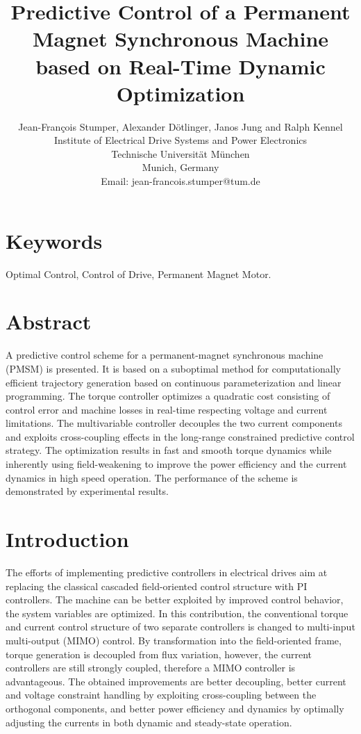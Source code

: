 \documentclass[a4paper,11pt,fleqn]{article}
\title{\LARGE \bf Predictive Control of a Permanent Magnet Synchronous Machine based on Real-Time Dynamic Optimization
}
\author{
Jean-Fran\c cois Stumper, Alexander D\"otlinger, Janos Jung and Ralph Kennel\\
Institute of Electrical Drive Systems and Power Electronics\\
Technische Universit\"at M\"unchen\\
Munich, Germany\\
Email: jean-francois.stumper@tum.de}
\date{}
\begin{document}
\setlength{\parindent}{0mm}
\baselineskip 10pt


\maketitle




\section*{Keywords}
\flqq Optimal Control\frqq, \flqq Control of Drive\frqq, \flqq Permanent Magnet Motor\frqq.




\section*{Abstract}

A predictive control scheme for a permanent-magnet synchronous machine (PMSM) is presented. It is based on a suboptimal method for computationally efficient trajectory generation based on continuous parameterization and linear programming. The torque controller optimizes a quadratic cost consisting of control error and machine losses in real-time respecting voltage and current limitations. The multivariable controller decouples the two current components and exploits cross-coupling effects in the long-range constrained predictive control strategy. The optimization results in fast and smooth torque dynamics while inherently using field-weakening to improve the power efficiency and the current dynamics in high speed operation. The performance of the scheme is demonstrated by experimental results.






\section*{Introduction}

The efforts of implementing predictive controllers in electrical drives aim at replacing the classical cascaded field-oriented control structure with PI controllers. The machine can be better exploited by improved control behavior, the system variables are optimized. In this contribution, the conventional torque and current control structure of two separate controllers is changed to multi-input multi-output (MIMO) control. By transformation into the field-oriented frame, torque generation is decoupled from flux variation, however, the current controllers are still strongly coupled, therefore a MIMO controller is advantageous. The obtained improvements are better decoupling, better current and voltage constraint handling by exploiting cross-coupling between the orthogonal components, and better power efficiency and dynamics by optimally adjusting the currents in both dynamic and steady-state operation.
\end{document}
